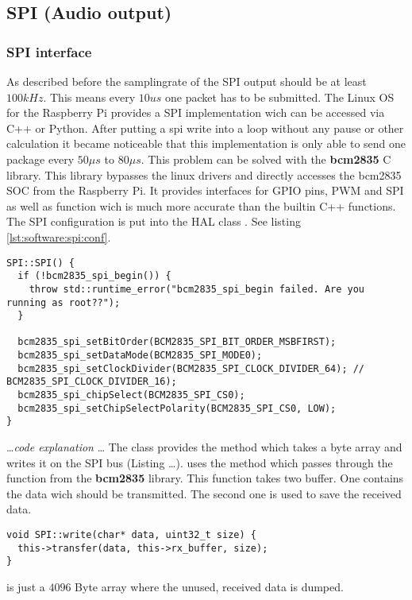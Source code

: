 \subsection{SPI (Audio output)}

\subsubsection*{SPI interface}

As described before the samplingrate of the SPI output should be at least $100kHz$. This means every $10us$ one packet has to be submitted. The Linux OS for the Raspberry Pi provides a SPI implementation wich can be accessed via C++ or Python. After putting a spi write into a loop without any pause or other calculation it became noticeable that this implementation is only able to send one package every $50\mu s$ to $80\mu s$. This problem can be solved with the \textbf{bcm2835} C library.\cite{mccauley_bcm2835_nodate} This library bypasses the linux drivers and directly accesses the bcm2835 SOC from the Raspberry Pi. It provides interfaces for GPIO pins, PWM and SPI as well as  function wich is much more accurate than the builtin C++ functions.\p
%
The SPI configuration is put into the HAL class . See listing \ref{lst:software:spi:conf}.\p
%
\begin{mdframed}
\begin{lstlisting}[caption=SPI configuration, label=lst:software:spi:conf]
SPI::SPI() {
  if (!bcm2835_spi_begin()) {
    throw std::runtime_error("bcm2835_spi_begin failed. Are you running as root??");
  }

  bcm2835_spi_setBitOrder(BCM2835_SPI_BIT_ORDER_MSBFIRST);
  bcm2835_spi_setDataMode(BCM2835_SPI_MODE0);
  bcm2835_spi_setClockDivider(BCM2835_SPI_CLOCK_DIVIDER_64); // BCM2835_SPI_CLOCK_DIVIDER_16);
  bcm2835_spi_chipSelect(BCM2835_SPI_CS0);
  bcm2835_spi_setChipSelectPolarity(BCM2835_SPI_CS0, LOW);
}
\end{lstlisting}
\end{mdframed}
%
\dots \textit{code explanation} \dots\p
%
The  class provides the method  which takes a byte array and writes it on the SPI bus (Listing \dots).  uses the method  which passes through the function  from the \textbf{bcm2835} library. This function takes two buffer. One contains the data wich should be transmitted. The second one is used to save the received data.
%
\begin{mdframed}
\begin{lstlisting}[caption=Method for writing data onto the SPI bus, label=lst:software:spi:write]
void SPI::write(char* data, uint32_t size) {
  this->transfer(data, this->rx_buffer, size);
}
\end{lstlisting}
\end{mdframed}
%
 is just a $4096$ Byte array where the unused, received data is dumped.
%
